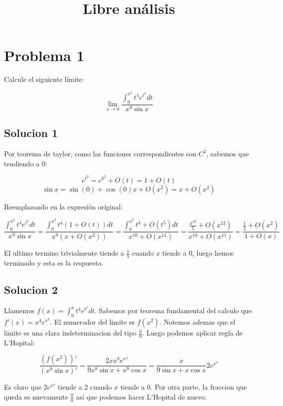 \documentclass{article}
\title{Libre análisis}
\author{}
\date{}
\begin{document}
\maketitle

\section{Problema 1}

Calcule el siguiente límite:

$$\lim_{x \rightarrow 0}{\frac{\int_0^{x^2}{t^4e^{t^2}dt}}{x^9 \sin x}}$$

\subsection{Solucion 1}

Por teorema de taylor, como las funciones correspondientes son $C^2$, sabemos que tendiendo a 0:

$$e^{t^2} = e^{0^2} + O(t) = 1 + O(t)$$
$$\sin x = \sin(0) + \cos (0) x + O(x^2) =  x + O(x^2)$$

Reemplazando en la expresión original:

$$\frac{\int_0^{x^2}{t^4e^{t^2}dt}}{x^9 \sin x} = \frac{\int_0^{x^2}{t^4(1 + O(t))dt}}{x^9 (x + O(x^2))} = 
              \frac{\int_0^{x^2}{t^4 + O(t^5) dt}}{x^{10} + O(x^{11})} =  \frac{\frac{x^{10}}{5} + O(x^{12})}{x^{10} + O(x^{11})} = 
                \frac{\frac{1}{5} + O(x^2)}{1 + O(x)}$$

El ultimo termino trivialmente tiende a $\frac{1}{5}$ cuando $x$ tiende a 0, luego hemos terminado y esta es la respuesta.

\subsection{Solucion 2}

Llamemos $f(x) = \int_0^{x}{t^4e^{t^2}dt}$. Sabemos por teorema fundamental del calculo que $f'(x) = x^4e^{x^2}$. El numerador del
limite es $f(x^2)$. Notemos ademas que el limite es una clara indeterminacion del tipo $\frac{0}{0}$. Luego podemos aplicar regla
de L'Hopital:

$$\frac{(f(x^2))'}{(x^9 \sin x)'} = \frac{2xx^8e^{x^4}}{9x^8 \sin x + x^9 \cos x} = \frac{x}{9 \sin x + x \cos x}2e^{x^4} $$

Es claro que $2e^{x^4}$ tiende a $2$ cuando $x$ tiende a 0. Por otra parte, la fraccion que queda es nuevamente $\frac{0}{0}$ asi que
podemos hacer L'Hopital de nuevo:
\end{document}
